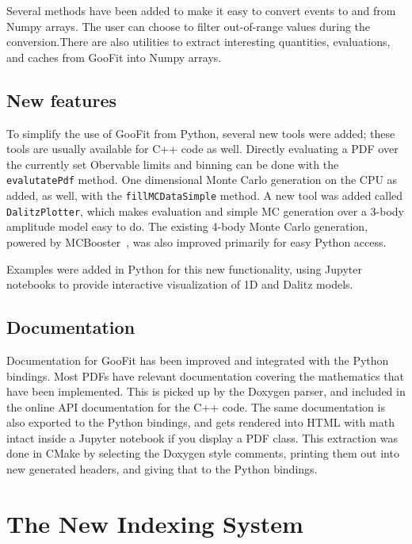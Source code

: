 \documentclass{webofc}
\begin{document}
Several methods have been added to make it easy to convert events to and from Numpy arrays. The user can choose to filter out-of-range values during the conversion.There are also utilities to extract interesting quantities, evaluations, and caches from GooFit into Numpy arrays. 

\subsection{New features}

To simplify the use of GooFit from Python, several new tools were added; these tools are usually available for C++ code as well. Directly evaluating a PDF over the currently set Obervable limits and binning can be done with the \texttt{evalutatePdf} method. One dimensional Monte Carlo generation on the CPU as added, as well, with the \texttt{fillMCDataSimple} method. A new tool was added called \texttt{DalitzPlotter}, which makes evaluation and simple MC generation over a 3-body amplitude model easy to do. The existing 4-body Monte Carlo generation, powered by MCBooster~\cite{lib:MCBooster}, was also improved primarily for easy Python access.

Examples were added in Python for this new functionality, using Jupyter notebooks to provide interactive visualization of 1D and Dalitz models.

\subsection{Documentation}

Documentation for GooFit has been improved and integrated with the Python bindings. Most PDFs have relevant documentation covering the mathematics that have been implemented. This is picked up by the Doxygen parser, and included in the online API documentation for the C++ code. The same documentation is also exported to the Python bindings, and gets rendered into HTML with math intact inside a Jupyter notebook if you display a PDF class. This extraction was done in CMake by selecting the Doxygen style comments, printing them out into new generated headers, and giving that to the Python bindings.

\section{The New Indexing System}
\label{sec-ind}
\end{document}
